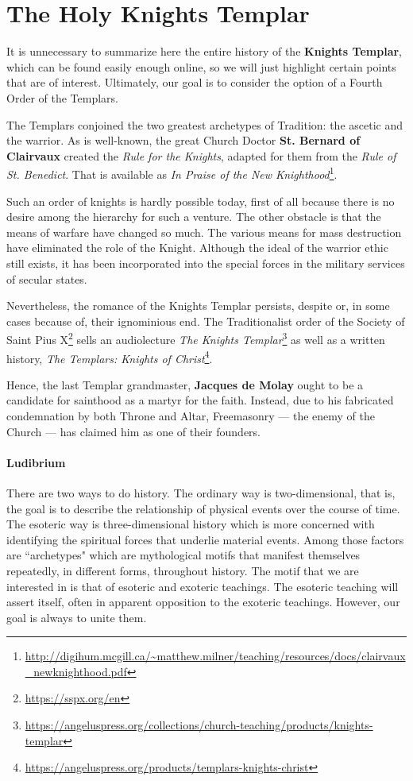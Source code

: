\section{The Holy Knights Templar}

It is unnecessary to summarize here the entire history of the \textbf{Knights Templar}, which can be found easily enough online, so we will just highlight certain points that are of interest. Ultimately, our goal is to consider the option of a Fourth Order of the Templars.

The Templars conjoined the two greatest archetypes of Tradition: the ascetic and the warrior. As is well-known, the great Church Doctor \textbf{St. Bernard of Clairvaux} created the \emph{Rule for the Knights}, adapted for them from the \emph{Rule of St. Benedict}. That is available as \textit{In Praise of the New Knighthood}\footnote{\url{http://digihum.mcgill.ca/~matthew.milner/teaching/resources/docs/clairvaux_newknighthood.pdf}}.

Such an order of knights is hardly possible today, first of all because there is no desire among the hierarchy for such a venture. The other obstacle is that the means of warfare have changed so much. The various means for mass destruction have eliminated the role of the Knight. Although the ideal of the warrior ethic still exists, it has been incorporated into the special forces in the military services of secular states.

Nevertheless, the romance of the Knights Templar persists, despite or, in some cases because of, their ignominious end. The Traditionalist order of the Society of Saint Pius X\footnote{\url{https://sspx.org/en}} sells an audiolecture \textit{The Knights Templar}\footnote{\url{https://angeluspress.org/collections/church-teaching/products/knights-templar}} as well as a written history, \textit{The Templars: Knights of Christ}\footnote{\url{https://angeluspress.org/products/templars-knights-christ}}.

Hence, the last Templar grandmaster, \textbf{Jacques de Molay} ought to be a candidate for sainthood as a martyr for the faith. Instead, due to his fabricated condemnation by both Throne and Altar, Freemasonry — the enemy of the Church — has claimed him as one of their founders.

\paragraph{Ludibrium}
There are two ways to do history. The ordinary way is two-dimensional, that is, the goal is to describe the relationship of physical events over the course of time. The esoteric way is three-dimensional history which is more concerned with identifying the spiritual forces that underlie material events. Among those factors are ``archetypes" which are mythological motifs that manifest themselves repeatedly, in different forms, throughout history. The motif that we are interested in is that of esoteric and exoteric teachings. The esoteric teaching will assert itself, often in apparent opposition to the exoteric teachings. However, our goal is always to unite them.

